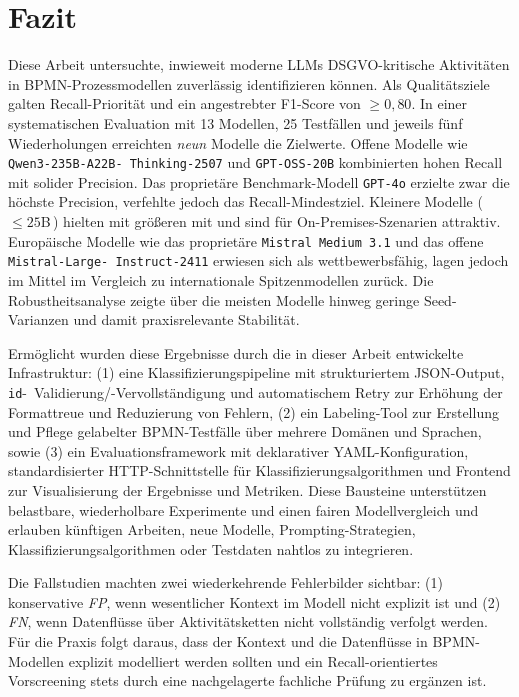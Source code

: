 \chapter{Fazit}\label{ch:fazit}

Diese Arbeit untersuchte, inwieweit moderne \acp{LLM} \ac{DSGVO}-kritische Aktivitäten in \ac{BPMN}-Prozessmodellen zuverlässig identifizieren können. Als Qualitätsziele galten Recall-Priorität und ein angestrebter F1-Score von $\geq 0{,}80$. In einer systematischen Evaluation mit 13 Modellen, 25 Testfällen und jeweils fünf Wiederholungen erreichten \emph{neun} Modelle die Zielwerte. Offene Modelle wie \texttt{Qwen3-235B-A22B-\linebreak~Thinking-2507} und \texttt{GPT-OSS-20B} kombinierten hohen Recall mit solider Precision. Das proprietäre Benchmark-Modell \texttt{GPT-4o} erzielte zwar die höchste Precision, verfehlte jedoch das Recall-Mindestziel. Kleinere Modelle (\,$\leq 25$B\,) hielten mit größeren mit und sind für On-Premises-Szenarien attraktiv. Europäische Modelle wie das proprietäre \texttt{Mistral Medium 3.1} und das offene \texttt{Mistral-Large-\linebreak~Instruct-2411} erwiesen sich als wettbewerbsfähig, lagen jedoch im Mittel im Vergleich zu internationale Spitzenmodellen zurück. Die Robustheitsanalyse zeigte über die meisten Modelle hinweg geringe Seed-Varianzen und damit praxisrelevante Stabilität.

Ermöglicht wurden diese Ergebnisse durch die in dieser Arbeit entwickelte Infrastruktur: (1) eine Klassifizierungspipeline mit strukturiertem JSON-Output, \texttt{id}-\linebreak~Validierung/-Vervollständigung und automatischem Retry zur Erhöhung der Formattreue und Reduzierung von Fehlern, (2) ein Labeling-Tool zur Erstellung und Pflege gelabelter \ac{BPMN}-Testfälle über mehrere Domänen und Sprachen, sowie (3) ein Evaluationsframework mit deklarativer YAML-Konfiguration, standardisierter HTTP-Schnittstelle für Klassifizierungsalgorithmen und Frontend zur Visualisierung der Ergebnisse und Metriken. Diese Bausteine unterstützen belastbare, wiederholbare Experimente und einen fairen Modellvergleich und erlauben künftigen Arbeiten, neue Modelle, Prompting-Strategien, Klassifizierungsalgorithmen oder Testdaten nahtlos zu integrieren.

Die Fallstudien machten zwei wiederkehrende Fehlerbilder sichtbar: (1) konservative \emph{FP}, wenn wesentlicher Kontext im Modell nicht explizit ist und (2) \emph{FN}, wenn Datenflüsse über Aktivitätsketten nicht vollständig verfolgt werden. Für die Praxis folgt daraus, dass der Kontext und die Datenflüsse in \ac{BPMN}-Modellen explizit modelliert werden sollten und ein Recall-orientiertes Vorscreening stets durch eine nachgelagerte fachliche Prüfung zu ergänzen ist.

